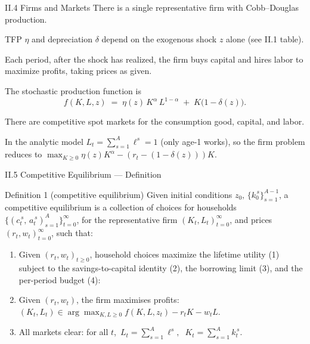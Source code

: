 \documentclass[aspectratio=169,11pt]{beamer}
\newcommand{\emphc}[1]{\textcolor{harvardcrimson}{#1}}
\begin{document}
\begin{frame}{II.4 Firms and Markets}
\small
There is a single representative firm with \emphc{Cobb--Douglas} production.

\vspace{0.3em}
TFP $\eta$ and depreciation $\delta$ depend on the exogenous shock $z$ alone (see II.1 table).

\vspace{0.3em}
Each period, \emphc{after the shock has realized}, the firm buys capital and hires labor to maximize profits, taking prices as given.

\vspace{0.4em}
The stochastic production function is
\[
f(K, L, z) \;=\; \eta(z)\, K^\alpha\, L^{1-\alpha} \;+\; K\bigl(1-\delta(z)\bigr).
\]

\vspace{0.4em}
There are \emphc{competitive spot markets} for the consumption good, capital, and labor.

\vspace{0.5em}
{\footnotesize In the analytic model $L_t = \sum_{s=1}^A \ell^s = 1$ (only age-1 works), so the firm problem reduces to $\max_{K \ge 0} \eta(z) K^\alpha - (r_t - (1-\delta(z))) K$.}
\end{frame}


\begin{frame}{II.5 Competitive Equilibrium --- Definition}
\footnotesize
\begin{block}{Definition 1 (competitive equilibrium)}
\vspace{-2pt}
Given initial conditions $z_0,\,\{k_0^{\,s}\}_{s=1}^{A-1}$, a competitive equilibrium is a collection of choices for households $\bigl\{(c_t^{\,s},\,a_t^{\,s})_{s=1}^{A}\bigr\}_{t=0}^{\infty}$, for the representative firm $(K_t, L_t)_{t=0}^{\infty}$, and prices $(r_t, w_t)_{t=0}^{\infty}$, such that:
\begin{enumerate}\itemsep1pt
    \item Given $(r_t, w_t)_{t\ge 0}$, household choices maximize the lifetime utility (1) subject to the savings-to-capital identity (2), the borrowing limit (3), and the per-period budget (4):\\[1pt]
    \mbox{}
    \item Given $(r_t, w_t)$, the firm maximises profits:\\[1pt]
    \mbox{}\hspace{1em}$(K_t, L_t) \in \arg\max_{K, L \ge 0} f(K, L, z_t) - r_t K - w_t L$.
    \item \emphc{All markets clear:} for all $t$,\;\, $L_t = \sum_{s=1}^A \ell^s, \;\; K_t = \sum_{s=1}^A k_t^{\,s}.$
\end{enumerate}
\vspace{-2pt}
\end{block}
\end{frame}
\end{document}
